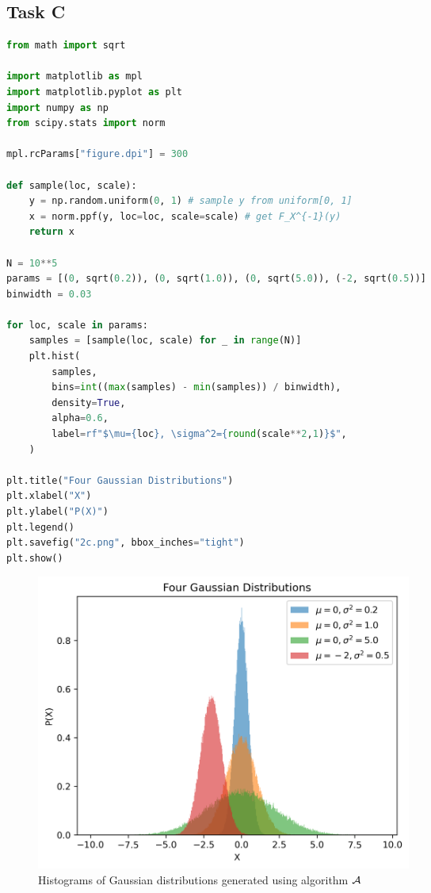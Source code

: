 \subsection*{Task C}
\begin{lstlisting}[language=Python, caption={Python code to implement algorithm $\cal{A}$ and plot their histograms}, label=lst:gaussian-algo]
from math import sqrt

import matplotlib as mpl
import matplotlib.pyplot as plt
import numpy as np
from scipy.stats import norm

mpl.rcParams["figure.dpi"] = 300

def sample(loc, scale):
    y = np.random.uniform(0, 1) # sample y from uniform[0, 1]
    x = norm.ppf(y, loc=loc, scale=scale) # get F_X^{-1}(y)
    return x

N = 10**5
params = [(0, sqrt(0.2)), (0, sqrt(1.0)), (0, sqrt(5.0)), (-2, sqrt(0.5))]
binwidth = 0.03

for loc, scale in params:
    samples = [sample(loc, scale) for _ in range(N)]
    plt.hist(
        samples,
        bins=int((max(samples) - min(samples)) / binwidth),
        density=True,
        alpha=0.6,
        label=rf"$\mu={loc}, \sigma^2={round(scale**2,1)}$",
    )

plt.title("Four Gaussian Distributions")
plt.xlabel("X")
plt.ylabel("P(X)")
plt.legend()
plt.savefig("2c.png", bbox_inches="tight")
plt.show()
\end{lstlisting}
\begin{figure}[H]
	\centering
	\includegraphics[width=0.6\textwidth]{images/2c.png}
	\caption{Histograms of Gaussian distributions generated using algorithm $\cal{A}$}
\end{figure}

